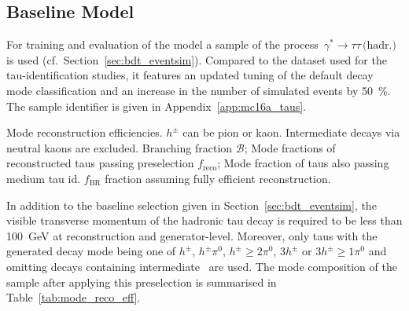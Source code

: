 \subsection{Baseline Model}
\label{sec:pfo_baseline}

For training and evaluation of the model a sample of the
process~$\gamma^* \rightarrow \tau \tau \, \text{(hadr.)}$ is used (cf.\
Section~\ref{sec:bdt_eventsim}). Compared to the dataset used for the
tau-identification studies, it features an updated tuning of the default decay
mode classification and an increase in the number of simulated events by
\SI{50}{\percent}. The sample identifier is given in
Appendix~\ref{app:mc16a_taus}.

\begin{table}[htb]
  \centering
  
  \caption{Mode reconstruction efficiencies. $h^\pm$ can be pion or kaon.
    Intermediate decays via neutral kaons are excluded. Branching fraction
    $\mathcal{B}$; Mode fractions of reconstructed taus passing preselection
    $f_\text{reco}$; Mode fraction of taus also passing medium tau id.
    $f_\text{BR}$ fraction assuming fully efficient reconstruction.}
  \label{tab:mode_reco_eff}
\end{table}

In addition to the baseline selection given in Section~\ref{sec:bdt_eventsim},
the visible transverse momentum of the hadronic tau decay is required to be less
than \SI{100}{\giga\electronvolt} at reconstruction and generator-level.
Moreover, only taus with the generated decay mode being one of $h^\pm$,
$h^\pm \pi^0$, $h^\pm \geq 2\pi^0$, $3h^\pm$ or $3h^\pm \geq 1\pi^0$ and
omitting decays containing intermediate~\smash{$\text{K}^0$} are used. The mode
composition of the sample after applying this preselection is summarised in
Table~\ref{tab:mode_reco_eff}.

